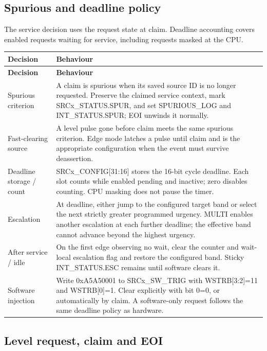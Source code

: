 \documentclass[11pt]{article}
\begin{document}
\subsection{Spurious and deadline policy}
\noindent The service decision uses the request state at claim. Deadline accounting covers enabled requests waiting for service, including requests masked at the CPU.\par\medskip
{\small
\begin{longtable}{@{}L{0.2500\dimexpr\linewidth-12pt\relax}L{0.7500\dimexpr\linewidth-12pt\relax}@{}}
\toprule
\textbf{Decision} & \textbf{Behaviour} \\ \midrule
\endfirsthead
\toprule
\textbf{Decision} & \textbf{Behaviour} \\ \midrule
\endhead
Spurious criterion & A claim is spurious when its saved source ID is no longer requested. Preserve the claimed service context, mark SRCx\_STATUS.SPUR, and set SPURIOUS\_LOG and INT\_STATUS.SPUR; EOI unwinds it normally. \\ \addlinespace[3pt]
Fast-clearing source & A level pulse gone before claim meets the same spurious criterion. Edge mode latches a pulse until claim and is the appropriate configuration when the event must survive deassertion. \\ \addlinespace[3pt]
Deadline storage / count & SRCx\_CONFIG[31:16] stores the 16-bit cycle deadline. Each slot counts while enabled pending and inactive; zero disables counting. CPU masking does not pause the timer. \\ \addlinespace[3pt]
Escalation & At deadline, either jump to the configured target band or select the next strictly greater programmed urgency. MULTI enables another escalation at each further deadline; the effective band cannot advance beyond the highest urgency. \\ \addlinespace[3pt]
After service / idle & On the first edge observing no wait, clear the counter and wait-local escalation flag and restore the configured band. Sticky INT\_STATUS.ESC remains until software clears it. \\ \addlinespace[3pt]
Software injection & Write 0xA5A50001 to SRCx\_SW\_TRIG with WSTRB[3:2]=11 and WSTRB[0]=1. Clear explicitly with bit 0=0, or automatically by claim. A software-only request follows the same deadline policy as hardware. \\*
\bottomrule\end{longtable}}

\subsection{Level request, claim and EOI}
\end{document}
